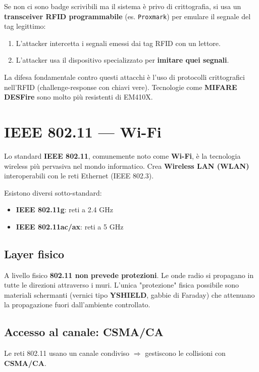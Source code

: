 Se non ci sono badge scrivibili ma il sistema \`e privo di crittografia, si usa un \textbf{transceiver RFID programmabile} (es. \texttt{Proxmark}) per emulare il segnale del tag legittimo:
\begin{enumerate}
  \item L'attacker intercetta i segnali emessi dai tag RFID con un lettore.
  \item L'attacker usa il dispositivo specializzato per \textbf{imitare quei segnali}.
\end{enumerate}

La difesa fondamentale contro questi attacchi \`e l'uso di protocolli crittografici nell'RFID (challenge-response con chiavi vere). Tecnologie come \textbf{MIFARE DESFire} sono molto pi\`u resistenti di EM410X.

\section{IEEE 802.11 --- Wi-Fi}

Lo standard \textbf{IEEE 802.11}, comunemente noto come \textbf{Wi-Fi}, \`e la tecnologia wireless pi\`u pervasiva nel mondo informatico. Crea \textbf{Wireless LAN (WLAN)} interoperabili con le reti Ethernet (IEEE 802.3).

Esistono diversi sotto-standard:
\begin{itemize}
  \item \textbf{IEEE 802.11g}: reti a 2.4 GHz
  \item \textbf{IEEE 802.11ac/ax}: reti a 5 GHz
\end{itemize}

\subsection{Layer fisico}

A livello fisico \textbf{802.11 non prevede protezioni}. Le onde radio si propagano in tutte le direzioni attraverso i muri. L'unica "protezione" fisica possibile sono materiali schermanti (vernici tipo \textbf{YSHIELD}, gabbie di Faraday) che attenuano la propagazione fuori dall'ambiente controllato.

\subsection{Accesso al canale: CSMA/CA}

Le reti 802.11 usano un canale condiviso $\Rightarrow$ gestiscono le collisioni con \textbf{CSMA/CA}.

